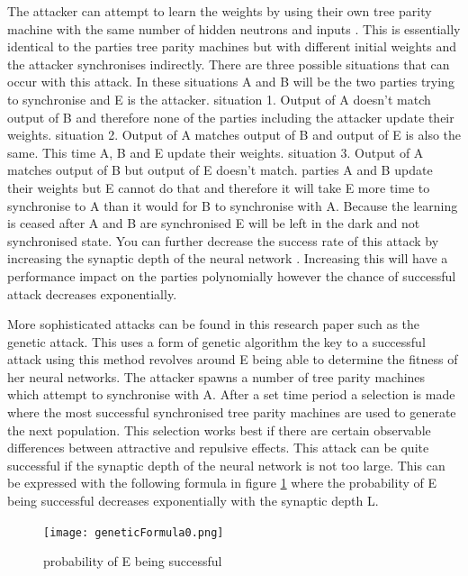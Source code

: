 The attacker can attempt to learn the weights by using their own tree parity machine with the same number of hidden neutrons and inputs \cite{Private_Inputs_to_Tree_Parity_Machine}. This is essentially identical to the parties tree parity machines but with different initial weights and the attacker synchronises indirectly.
There are three possible situations that can occur with this attack. In these situations A and B will be the two parties trying to synchronise and E is the attacker.
situation 1. Output of A doesn't match output of B and therefore none of the parties including the attacker update their weights.
situation 2. Output of A matches output of B and output of E is also the same. This time A, B and E update their weights.
situation 3. Output of A matches output of B but output of E doesn't match. parties A and B update their weights but E cannot do that and therefore it will take E more time to synchronise to A than it would for B to synchronise with A. Because the learning is ceased after A and B are synchronised E will be left in the dark and not synchronised state. You can further decrease the success rate of this attack by increasing the synaptic depth of the neural network \cite{Private_Inputs_to_Tree_Parity_Machine}. Increasing this will have a performance impact on the parties polynomially however the chance of successful attack decreases exponentially.

More sophisticated attacks can be found in this research paper \cite{BIG_ResearchPaper} such as the genetic attack.
This uses a form of genetic algorithm the key to a successful attack using this method revolves around E being able to determine the fitness of her neural networks.
The attacker spawns a number of tree parity machines which attempt to synchronise with A. After a set time period a selection is made where the most successful synchronised tree parity machines are used to generate the next population. This selection works best if there are certain observable differences between attractive and repulsive effects. 
This attack can be quite successful if the synaptic depth of the neural network is not too large. This can be expressed with the following formula in figure \ref{fig:geneticESuccess} where the probability of E being successful decreases exponentially with the synaptic depth L.
\begin{figure}[ht]
  \centering
      \texttt{[image: geneticFormula0.png]}
  \caption[probability of E being successful]{probability of E being successful\cite{BIG_ResearchPaper}}
  \label{fig:geneticESuccess}
\end{figure}

